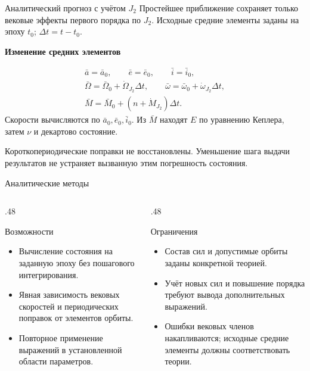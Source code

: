 \documentclass[11pt,aspectratio=169,t]{beamer}
\begin{document}
\begin{frame}{Аналитический прогноз с учётом $J_2$}
\setlength{\abovedisplayskip}{3pt}\setlength{\belowdisplayskip}{3pt}
\justifying
Простейшее приближение сохраняет только вековые эффекты первого порядка по $J_2$. Исходные средние элементы заданы на эпоху $t_0$; $\Delta t=t-t_0$.
\par\smallskip
\textbf{Изменение средних элементов}\par
\[
\begin{gathered}
\bar a=\bar a_0,\qquad \bar e=\bar e_0,\qquad \bar i=\bar i_0,\\
\bar\Omega=\bar\Omega_0+\dot\Omega_{J_2}\Delta t,\qquad
\bar\omega=\bar\omega_0+\dot\omega_{J_2}\Delta t,\\
\bar M=\bar M_0+(n+\dot M_{J_2})\Delta t.
\end{gathered}
\]
\justifying
Скорости вычисляются по $\bar a_0,\bar e_0,\bar i_0$. Из $\bar M$ находят $E$ по уравнению Кеплера, затем $\nu$ и декартово состояние.\par\smallskip
Короткопериодические поправки не восстановлены. Уменьшение шага выдачи результатов не устраняет вызванную этим погрешность состояния.\par
\end{frame}

\begin{frame}{Аналитические методы}
\begin{columns}[T,onlytextwidth]
\begin{column}{.48\textwidth}
\begin{block}{Возможности}
\begin{itemize}\setlength{\itemsep}{4pt}
\item Вычисление состояния на заданную эпоху без пошагового интегрирования.
\item Явная зависимость вековых скоростей и периодических поправок от элементов орбиты.
\item Повторное применение выражений в установленной области параметров.
\end{itemize}
\end{block}
\end{column}
\begin{column}{.48\textwidth}
\begin{block}{Ограничения}
\begin{itemize}\setlength{\itemsep}{4pt}
\item Состав сил и допустимые орбиты заданы конкретной теорией.
\item Учёт новых сил и повышение порядка требуют вывода дополнительных выражений.
\item Ошибки вековых членов накапливаются; исходные средние элементы должны соответствовать теории.
\end{itemize}
\end{block}
\end{column}
\end{columns}
\end{frame}
\end{document}
